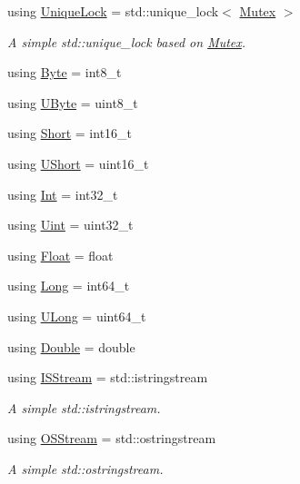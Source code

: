 \begin{DoxyCompactItemize}
using \mbox{\hyperlink{namespaceo_a_a2a6e84e4843983460eace0e5ae899a1e}{Unique\+Lock}} = std\+::unique\+\_\+lock$<$ \mbox{\hyperlink{namespaceo_a_adc2c4dfe90e78df47ae2e677a4d0f9fa}{Mutex}} $>$
\begin{DoxyCompactList}\small\item\em A simple std\+::unique\+\_\+lock based on \mbox{\hyperlink{namespaceo_a_adc2c4dfe90e78df47ae2e677a4d0f9fa}{Mutex}}. \end{DoxyCompactList}\item 
using \mbox{\hyperlink{namespaceo_a_a2b99671898a8eb4bc6ab35036701d732}{Byte}} = int8\+\_\+t
\item 
using \mbox{\hyperlink{namespaceo_a_a8c38e43a304d568b8495770dd8d50513}{U\+Byte}} = uint8\+\_\+t
\item 
using \mbox{\hyperlink{namespaceo_a_a17d2753cd7febb25f447b0cff6cec6eb}{Short}} = int16\+\_\+t
\item 
using \mbox{\hyperlink{namespaceo_a_a0e8a8217ae95045f36575875dcb54537}{U\+Short}} = uint16\+\_\+t
\item 
using \mbox{\hyperlink{namespaceo_a_aa575525a7b0116822c73d43fa671a58c}{Int}} = int32\+\_\+t
\item 
using \mbox{\hyperlink{namespaceo_a_abe1d8250226c5cf34f84d7b75fc7922e}{Uint}} = uint32\+\_\+t
\item 
using \mbox{\hyperlink{namespaceo_a_a513e9cb16924b482268ab3fcdf1f2499}{Float}} = float
\item 
using \mbox{\hyperlink{namespaceo_a_ab34d92c907da3ac86211277a1341c6c2}{Long}} = int64\+\_\+t
\item 
using \mbox{\hyperlink{namespaceo_a_aeb20ba1e00df0faadde3654ff7d8c4e7}{U\+Long}} = uint64\+\_\+t
\item 
using \mbox{\hyperlink{namespaceo_a_a2bcc976232176d2dcf8b9df1fa33c038}{Double}} = double
\item 
using \mbox{\hyperlink{namespaceo_a_a60595f5d8b3d5dbbb9d1ed512917b09b}{I\+S\+Stream}} = std\+::istringstream
\begin{DoxyCompactList}\small\item\em A simple std\+::istringstream. \end{DoxyCompactList}\item 
using \mbox{\hyperlink{namespaceo_a_a9075675ddf98c92f09ba17d3b993a72a}{O\+S\+Stream}} = std\+::ostringstream
\begin{DoxyCompactList}\small\item\em A simple std\+::ostringstream. \end{DoxyCompactList}\item 

\end{DoxyCompactItemize}
